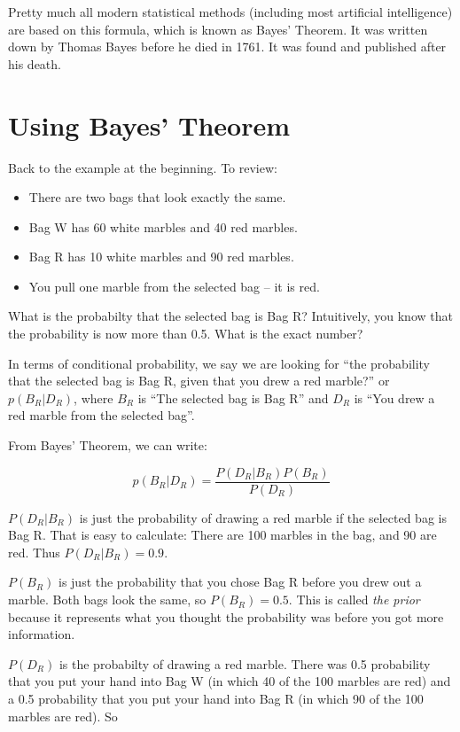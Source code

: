 Pretty much all modern statistical methods (including most artificial
intelligence) are based on this formula, which is known as Bayes'
Theorem.  It was written down by Thomas Bayes before he died in
1761. It was found and published after his death.

\section{Using Bayes' Theorem}

Back to the example at the beginning. To review:

\begin{itemize}
\item There are two bags that look exactly the same.
\item Bag W has 60 white marbles and 40 red marbles.
\item Bag R has 10 white marbles and 90 red marbles.
\item You pull one marble from the selected bag -- it is red.
\end{itemize}

What is the probabilty that the selected bag is Bag R? Intuitively,
you know that the probability is now more than 0.5. What is the exact
number?

In terms of conditional probability, we say we are looking for ``the probability
that the selected bag is Bag R, given that you drew a red marble?'' or
$p(B_R | D_R)$, where $B_R$ is ``The selected bag is Bag R'' and $D_R$ is
``You drew a red marble from the selected bag''.

From Bayes' Theorem, we can write:

$$p(B_R | D_R) = \frac{ P(D_R | B_R) P(B_R) } {P(D_R)}$$

$P(D_R | B_R)$ is just the probability of drawing a red marble if the
selected bag is Bag R. That is easy to calculate: There are 100
marbles in the bag, and 90 are red.  Thus $P(D_R | B_R) = 0.9$.

$P(B_R)$ is just the probability that you chose Bag R before you drew
out a marble. Both bags look the same, so $P(B_R)= 0.5$.  This is
called \textit{the prior} because it represents what you thought the
probability was before you got more information.

$P(D_R)$ is the probabilty of drawing a red marble. There was 0.5
probability that you put your hand into Bag W (in which 40 of the 100
marbles are red) and a 0.5 probability that you put your hand into Bag
R (in which 90 of the 100 marbles are red).  So

